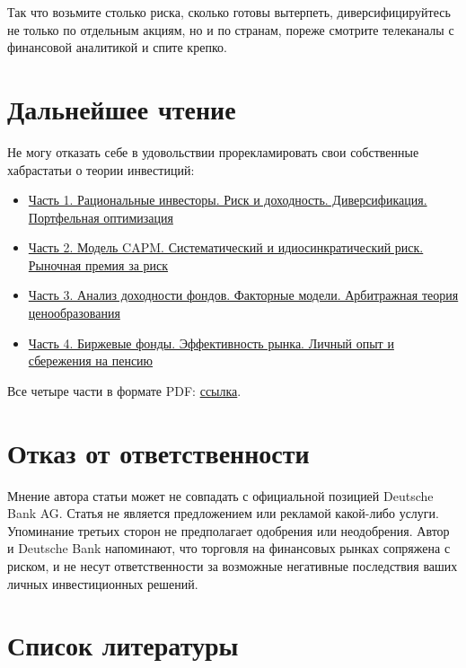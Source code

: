 Так что возьмите столько риска, сколько готовы вытерпеть, диверсифицируйтесь не только по отдельным акциям, но и по странам, пореже смотрите телеканалы с финансовой аналитикой и спите крепко.

\section*{Дальнейшее чтение}

Не могу отказать себе в удовольствии прорекламировать свои собственные хабрастатьи о теории инвестиций:

\begin{itemize}
\item \href{https://habr.com/ru/company/dbtc/blog/527050/}{Часть 1. Рациональные инвесторы. Риск и доходность. Диверсификация. Портфельная оптимизация}
\item \href{https://habr.com/ru/company/dbtc/blog/527218/}{Часть 2. Модель CAPM. Систематический и идиосинкратический риск. Рыночная премия за риск}
\item \href{https://habr.com/ru/company/dbtc/blog/527280/}{Часть 3. Анализ доходности фондов. Факторные модели. Арбитражная теория ценообразования}
\item \href{https://habr.com/ru/company/dbtc/blog/527302/}{Часть 4. Биржевые фонды. Эффективность рынка. Личный опыт и сбережения на пенсию}
\end{itemize}
Все четыре части в формате PDF: \href{https://artem-bakulin.github.io/latex/papers/index-investing/}{ссылка}.

\section*{Отказ от ответственности}

Мнение автора статьи может не совпадать с официальной позицией Deutsche Bank 
AG. Статья не является предложением или рекламой какой-либо услуги. Упоминание
третьих сторон не предполагает одобрения или неодобрения. Автор и Deutsche Bank
напоминают, что торговля на финансовых рынках сопряжена с риском, и не несут
ответственности за возможные негативные последствия ваших личных инвестиционных
решений.

\section*{Список литературы}
\en{
\printbibliography[heading = none]
}


